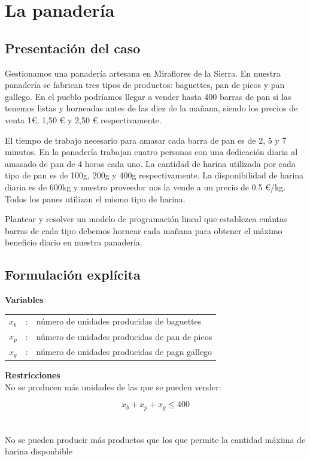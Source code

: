 \section{La panadería}

\subsection{Presentación del caso}

Gestionamos una panadería artesana en Miraflores de la Sierra. En nuestra panadería se fabrican tres tipos de productos: baguettes, pan de picos y pan gallego. En el pueblo podríamos llegar a vender hasta 400 barras de pan si las tenemos listas y horneadas antes de las diez de la mañana, siendo los precios de venta 1€, 1,50 € y 2,50 € respectivamente. 

El tiempo de trabajo necesario para amasar cada barra de pan es de 2, 5 y 7 minutos. En la panadería trabajan cuatro personas con una dedicación diaria al amasado de pan de 4 horas cada uno. La cantidad de harina utilizada por cada tipo de pan es de 100g, 200g y 400g respectivamente. La disponibilidad de harina diaria es de 600kg y nuestro proveedor nos la vende a un precio de 0.5 €/kg. Todos los panes utilizan el mismo tipo de harina.

Plantear y resolver un modelo de programación lineal que establezca cuántas barras de cada tipo debemos hornear cada mañana para obtener el máximo beneficio diario en nuestra panadería. 


\newpage
\subsection{Formulación explícita}

\textbf{Variables}

\begin{tabular}{l c l}
    $x_b$  & : & número de unidades producidas de baguettes\\
    $x_p$  & : & número de unidades producidas de pan de picos\\
    $x_g$  & : & número de unidades producidas de pagn gallego\\
\end{tabular}

\textbf{Restricciones}
\\
No se producen más unidades de las que se pueden vender:

\begin{equation}
    x_b + x_p + x_g \leq 400
\end{equation}
\\
\\
No se pueden producir más productos que los que permite la cantidad máxima de harina disponbible

